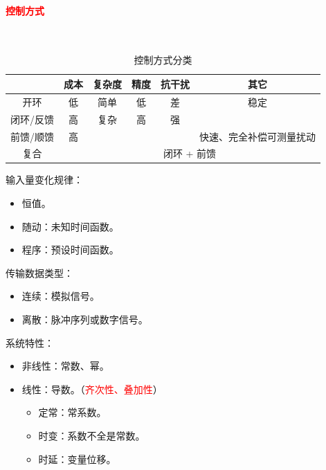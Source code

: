 \documentclass[
12pt, %
a4paper, 
oneside, %
]{scrartcl}
\begin{document}
\paragraph{\textcolor{red}{控制方式}}~\\
\begin{table}[H]
\centering
\begin{tabular}{|c|c|c|c|c|c|}
\hline
& 成本 & 复杂度 & 精度 & 抗干扰 & 其它 \\
\hline
开环 & 低 & 简单 & 低 & 差 & 稳定 \\
\hline
闭环/反馈 & 高 & 复杂 & 高 & 强 & \\
\hline
前馈/顺馈 & 高 & \multicolumn{3}{c|}{} & 快速、完全补偿可测量扰动 \\
\hline
复合 & \multicolumn{5}{c|}{闭环 + 前馈} \\
\hline
\end{tabular}
\caption{控制方式分类}
\end{table}

\begin{itemize}
\begin{minipage}[t]{0.5\textwidth}
\item 输入量变化规律：
\begin{itemize}
\item 恒值。
\item 随动：未知时间函数。
\item 程序：预设时间函数。
\end{itemize}
\item 传输数据类型：
\begin{itemize}
\item 连续：模拟信号。
\item 离散：脉冲序列或数字信号。
\end{itemize}
\end{minipage}
\begin{minipage}[t]{0.5\textwidth}
\item 系统特性：
\begin{itemize}
\item 非线性：常数、幂。
\item 线性：导数。（\textcolor{red}{齐次性、叠加性}）
\begin{itemize}
\item 定常：常系数。
\item 时变：系数不全是常数。
\item 时延：变量位移。
\end{itemize}
\end{itemize}
\end{minipage}
\end{itemize}
\end{document}
